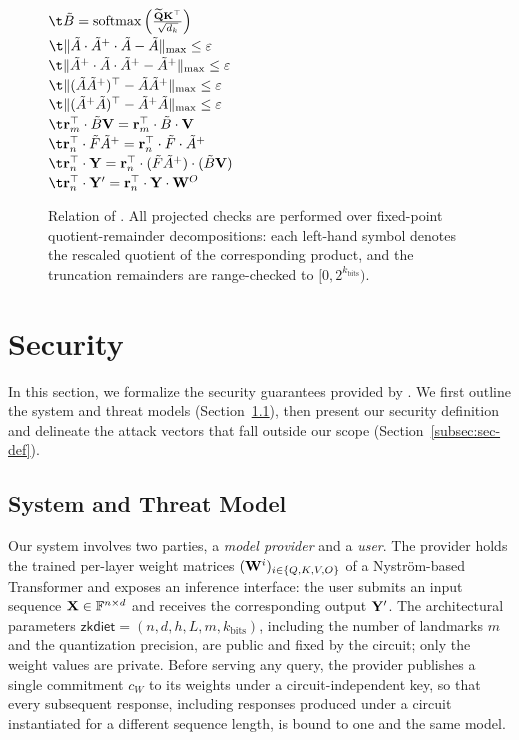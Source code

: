 \documentclass[runningheads]{llncs}
\begin{document}
\begin{figure}[t!]
{{        $\t \tilde{B} = \sfmax\left( \frac{\widetilde{\Q}\K^\top}{\sqrt{d_k}} \right)$ \\
        $\t \lVert \tilde{A} \cdot \tilde{A}^+ \cdot \tilde{A} - \tilde{A} \rVert_{\max} \leq \varepsilon$ \\
        $\t \lVert \tilde{A}^+ \cdot \tilde{A} \cdot \tilde{A}^+ - \tilde{A}^+ \rVert_{\max} \leq \varepsilon$ \\
        $\t \lVert (\tilde{A} \tilde{A}^+)^\top - \tilde{A}\tilde{A}^+ \rVert_{\max} \leq \varepsilon$ \\
        $\t \lVert (\tilde{A}^+\tilde{A})^\top - \tilde{A}^+\tilde{A} \rVert_{\max} \leq \varepsilon$ \\
        $\t \rand_m^\top \cdot \tilde{B}\V = \rand_m^\top \cdot \tilde{B} \cdot \V$ \\
        $\t \rand_n^\top \cdot \tilde{F}\tilde{A}^{+} = \rand_n^\top \cdot \tilde{F} \cdot \tilde{A}^+$ \\
        $\t \rand_n^\top \cdot \Y = \rand_n^\top \cdot (\tilde{F}\tilde{A}^{+}) \cdot (\tilde{B}\V)$ \\
        $\t \rand_n^\top \cdot \Y' = \rand_n^\top \cdot \Y \cdot \W^O$
}}
\caption{Relation of \name. All projected checks are performed over fixed-point quotient-remainder decompositions: each left-hand symbol denotes the rescaled quotient of the corresponding product, and the truncation remainders are range-checked to $[0, 2^{k_{\mathrm{bits}}})$.}
\label{fig:relation}
\end{figure}

\section{Security}
\label{sec:security}

In this section, we formalize the security guarantees provided by \name. We first outline the system and threat models (Section~\ref{subsec:threat-model}), then present our security definition and delineate the attack vectors that fall outside our scope (Section~\ref{subsec:sec-def}).

\subsection{System and Threat Model}
\label{subsec:threat-model}

Our system involves two parties, a \emph{model provider} and a \emph{user}. The provider holds the trained per-layer weight matrices $({\mathbf{W}}^i)_{i \in \{Q,K,V,O\}}$ of a Nystr\"om-based Transformer and exposes an inference interface: the user submits an input sequence ${\mathbf{X}} \in \mathbb{F}^{n \times d}$ and receives the corresponding output ${\mathbf{Y}}'$. The architectural parameters $\mathsf{zkdiet} = (n, d, h, L, m, k_{\mathrm{bits}})$, including the number of landmarks $m$ and the quantization precision, are public and fixed by the circuit; only the weight values are private. Before serving any query, the provider publishes a single commitment $c_{W}$ to its weights under a circuit-independent key, so that every subsequent response, including responses produced under a circuit instantiated for a different sequence length, is bound to one and the same model.
\end{document}
